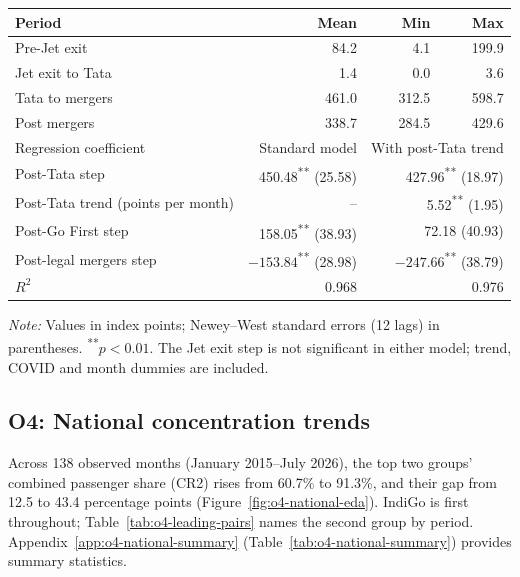 \documentclass[12pt,a4paper]{article}
\begin{document}
{\begin{minipage}{\linewidth}
\label{tab:o1-gap}
\centering
{\small{}\setlength{\tabcolsep}{5pt}
\begin{tabular}{@{}lrrr@{}}
\toprule
Period & Mean & Min & Max \\
\midrule
Pre-Jet exit & 84.2 & 4.1 & 199.9 \\
Jet exit to Tata & 1.4 & 0.0 & 3.6 \\
Tata to mergers & 461.0 & 312.5 & 598.7 \\
Post mergers & 338.7 & 284.5 & 429.6 \\
\midrule
Regression coefficient & Standard model & \multicolumn{2}{r}{With post-Tata trend} \\
\midrule
Post-Tata step & 450.48\textsuperscript{**} (25.58) & \multicolumn{2}{r}{427.96\textsuperscript{**} (18.97)} \\
Post-Tata trend (points per month) & -- & \multicolumn{2}{r}{5.52\textsuperscript{**} (1.95)} \\
Post-Go First step & 158.05\textsuperscript{**} (38.93) & \multicolumn{2}{r}{72.18 (40.93)} \\
Post-legal mergers step & $-153.84$\textsuperscript{**} (28.98) & \multicolumn{2}{r}{$-247.66$\textsuperscript{**} (38.79)} \\
$R^2$ & 0.968 & \multicolumn{2}{r}{0.976} \\
\bottomrule
\end{tabular}\par}
\vspace{4pt}
{\footnotesize{}\raggedright\textit{Note:} Values in index points; Newey--West standard errors (12 lags) in parentheses. \textsuperscript{**}$p<0.01$. The Jet exit step is not significant in either model; trend, COVID and month dummies are included.\par}
\end{minipage}
\par}

\clearpage
\subsection{O4: National concentration trends}
Across 138 observed months (January 2015--July 2026), the top two groups' combined passenger share (CR2) rises from 60.7\% to 91.3\%, and their gap from 12.5 to 43.4 percentage points (Figure~\ref{fig:o4-national-eda}). IndiGo is first throughout; Table~\ref{tab:o4-leading-pairs} names the second group by period. Appendix~\ref{app:o4-national-summary} (Table~\ref{tab:o4-national-summary}) provides summary statistics.
\end{document}
